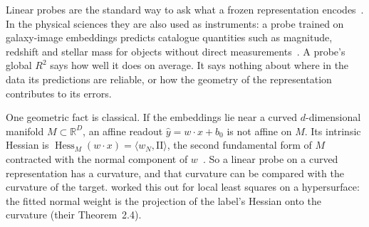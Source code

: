 \documentclass[10pt]{article}
\newcommand{\II}{\mathrm{II}}
\newcommand{\Hess}{\operatorname{Hess}_M}
\begin{document}
Linear probes are the standard way to ask what a frozen representation encodes~\citep{alain2017probes,belinkov2022probing}. In the physical sciences they are also used as instruments: a probe trained on galaxy-image embeddings predicts catalogue quantities such as magnitude, redshift and stellar mass for objects without direct measurements~\citep{smith2024astropt,duraphe2025platonic}. A probe's global $R^2$ says how well it does on average. It says nothing about where in the data its predictions are reliable, or how the geometry of the representation contributes to its errors.

One geometric fact is classical. If the embeddings lie near a curved $d$-dimensional manifold $M\subset\mathbb{R}^D$, an affine readout $\hat y=w\cdot x+b_0$ is not affine on $M$. Its intrinsic Hessian is $\Hess(w\cdot x)=\langle w_N,\II\rangle$, the second fundamental form of $M$ contracted with the normal component of $w$~\citep{milnor1963morse,chern1957total}. So a linear probe on a curved representation has a curvature, and that curvature can be compared with the curvature of the target. \citet{liu2023linear} worked this out for local least squares on a hypersurface: the fitted normal weight is the projection of the label's Hessian onto the curvature (their Theorem~2.4).
\end{document}
